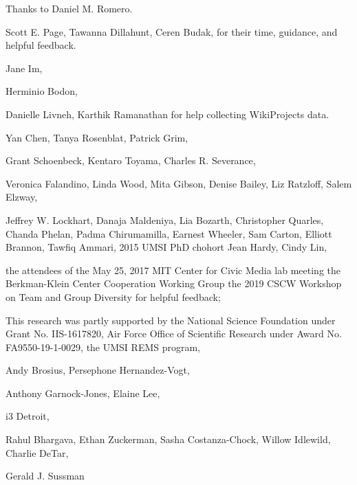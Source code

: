 Thanks to Daniel M. Romero.


Scott E. Page,
Tawanna Dillahunt,
Ceren Budak,
for their time, guidance, and helpful feedback.

Jane Im,

Herminio Bodon,

Danielle Livneh,
Karthik Ramanathan
for help collecting WikiProjects data.

Yan Chen,
Tanya Rosenblat,
Patrick Grim,

Grant Schoenbeck,
Kentaro Toyama,
Charles R. Severance,

Veronica Falandino,
Linda Wood,
Mita Gibson,
Denise Bailey,
Liz Ratzloff,
Salem Elzway,

Jeffrey W. Lockhart,
Danaja Maldeniya,
Lia Bozarth,
Christopher Quarles,
Chanda Phelan,
Padma Chirumamilla,
Earnest Wheeler,
Sam Carton,
Elliott Brannon,
Tawfiq Ammari,
2015 UMSI PhD chohort
Jean Hardy,
Cindy Lin,

the attendees of the May 25, 2017 MIT Center for Civic Media lab meeting
the Berkman-Klein Center Cooperation Working Group
the 2019 CSCW Workshop on Team and Group Diversity
for helpful feedback;

This research was partly supported by
the National Science Foundation under Grant No. IIS-1617820,
Air Force Office of Scientific Research under Award No. FA9550-19-1-0029,
the UMSI REMS program,

Andy Brosius,
Persephone Hernandez-Vogt,

Anthony Garnock-Jones,
Elaine Lee,

i3 Detroit,

Rahul Bhargava,
Ethan Zuckerman,
Sasha Costanza-Chock,
Willow Idlewild,
Charlie DeTar,

Gerald J. Sussman
